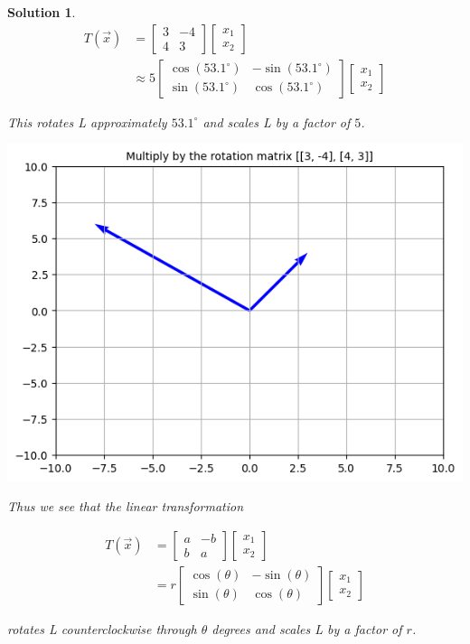 \documentclass{article}
\newtheorem*{solution}{Solution}
\begin{document}
\begin{solution}
\begin{align*}
T(\vec{x}) &= \begin{bmatrix}3 & -4 \\ 4 & 3 \end{bmatrix} \begin{bmatrix} x_{1} \\ x_{2} \end{bmatrix} \\
		&\approx 5 \begin{bmatrix} \cos(53.1^\circ) & -\sin(53.1^\circ) \\ \sin(53.1^\circ) & \cos(53.1^\circ) \end{bmatrix} \begin{bmatrix} x_{1} \\ x_{2} \end{bmatrix} 
\end{align*}

This rotates L approximately $53.1^\circ$ and scales L by a factor of $5$.

\includegraphics[scale=0.5, center]{Lrotscale345} 

Thus we see that the linear transformation

\begin{align*}
T(\vec{x}) &= \begin{bmatrix}a & -b \\ b & a \end{bmatrix} \begin{bmatrix} x_{1} \\ x_{2} \end{bmatrix} \\
		&= r \begin{bmatrix} \cos(\theta) & -\sin(\theta) \\ \sin(\theta) & \cos(\theta) \end{bmatrix} \begin{bmatrix} x_{1} \\ x_{2} \end{bmatrix} 
\end{align*}

rotates L counterclockwise through $\theta$ degrees and scales L by a factor of $r$.

\end{solution}
\end{document}
